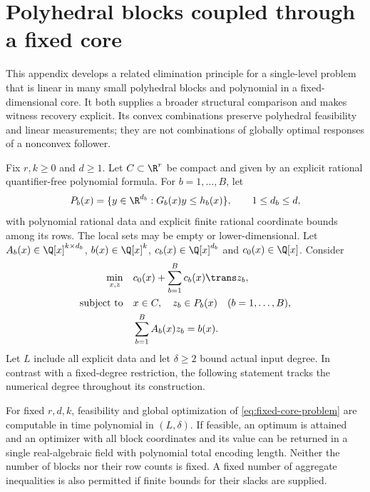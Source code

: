 \section{Polyhedral blocks coupled through a fixed core}\label{app:fixed-core}

This appendix develops a related elimination principle for a single-level
problem that is linear in many small polyhedral blocks and polynomial in
a fixed-dimensional core. It both supplies a broader structural comparison
and makes witness recovery explicit. Its convex combinations preserve
polyhedral feasibility and linear measurements; they are not combinations
of globally optimal responses of a nonconvex follower.

Fix $r,k\ge0$ and $d\ge1$. Let $C\subset\R^r$ be compact and given by an explicit
rational quantifier-free polynomial formula. For $b=1,\ldots,B$, let
\[
 P_b(x)=\{y\in\R^{d_b}:G_b(x)y\le h_b(x)\},\qquad 1\le d_b\le d,
\]
with polynomial rational data and explicit finite rational coordinate
bounds among its rows. The local sets may be empty or lower-dimensional.
Let $A_b(x)\in\Q[x]^{k\times d_b}$, $b(x)\in\Q[x]^k$,
$c_b(x)\in\Q[x]^{d_b}$ and $c_0(x)\in\Q[x]$. Consider
\begin{equation}\label{eq:fixed-core-problem}
 \begin{aligned}
 \min_{x,z}\quad&c_0(x)+\sum_{b=1}^B c_b(x)\trans z_b,\\
 \text{subject to}\quad&x\in C,\quad z_b\in P_b(x)\quad(b=1,\ldots,B),\\
 &\sum_{b=1}^B A_b(x)z_b=b(x).
 \end{aligned}
\end{equation}
Let $L$ include all explicit data and let $\delta\ge2$ bound actual
input degree. In contrast with a fixed-degree restriction, the following
statement tracks the numerical degree throughout its construction.

\begin{theorem}\label{thm:fixed-core}
For fixed $r,d,k$, feasibility and global optimization of
\eqref{eq:fixed-core-problem} are computable in time polynomial in
$(L,\delta)$. If feasible, an optimum is attained and an optimizer with
all block coordinates and its value can be returned in a single
real-algebraic field with polynomial total encoding length. Neither the
number of blocks nor their row counts is fixed. A fixed number of
aggregate inequalities is also permitted if finite bounds for their
slacks are supplied.
\end{theorem}

